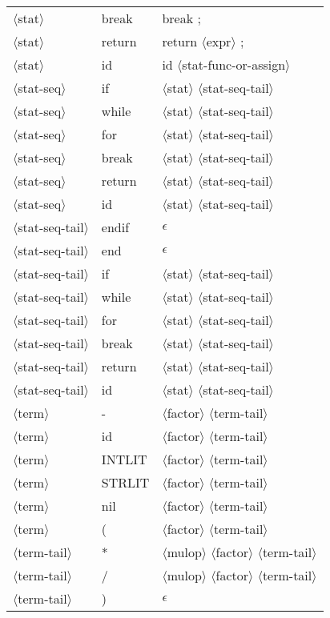 \documentclass[11pt, fleqn]{article}
\newcommand{\atag}[1]{$\langle$#1$\rangle$}
\begin{document}
\begin{longtable}{l|l|l}
\atag{stat}						&	break	&	break ;			\\
\atag{stat}						&	return	&	return \atag{expr} ;		\\
\atag{stat}						&	id		&	id \atag{stat-func-or-assign}		\\
\atag{stat-seq}					&	if		&	\atag{stat} \atag{stat-seq-tail}		\\
\atag{stat-seq}					&	while	&	\atag{stat} \atag{stat-seq-tail}		\\
\atag{stat-seq}					&	for		&	\atag{stat} \atag{stat-seq-tail}		\\
\atag{stat-seq}					&	break	&	\atag{stat} \atag{stat-seq-tail}		\\
\atag{stat-seq}					&	return	&	\atag{stat} \atag{stat-seq-tail}		\\
\atag{stat-seq}					&	id		&	\atag{stat} \atag{stat-seq-tail}		\\
\atag{stat-seq-tail}				&	endif			&	$\epsilon$	\\
\atag{stat-seq-tail}				&	end			&	$\epsilon$	\\
\atag{stat-seq-tail}				&	if			&	\atag{stat} \atag{stat-seq-tail}	\\
\atag{stat-seq-tail}				&	while			&	\atag{stat} \atag{stat-seq-tail}	\\
\atag{stat-seq-tail}				&	for			&	\atag{stat} \atag{stat-seq-tail}	\\
\atag{stat-seq-tail}				&	break			&	\atag{stat} \atag{stat-seq-tail}	\\
\atag{stat-seq-tail}				&	return			&	\atag{stat} \atag{stat-seq-tail}	\\
\atag{stat-seq-tail}				&	id			&	\atag{stat} \atag{stat-seq-tail}	\\
\atag{term}				&	-		&	\atag{factor} \atag{term-tail}		\\
\atag{term}				&	id		&	\atag{factor} \atag{term-tail}		\\
\atag{term}				&	INTLIT	&	\atag{factor} \atag{term-tail}		\\
\atag{term}				&	STRLIT	&	\atag{factor} \atag{term-tail}		\\
\atag{term}				&	nil		&	\atag{factor} \atag{term-tail}		\\
\atag{term}				&	(		&	\atag{factor} \atag{term-tail}		\\
\atag{term-tail}					&	*		&	\atag{mulop} \atag{factor} \atag{term-tail}		\\
\atag{term-tail}					&	/		&	\atag{mulop} \atag{factor} \atag{term-tail}		\\
\atag{term-tail}					&	)		&	$\epsilon$		\\

\end{longtable}
\end{document}
